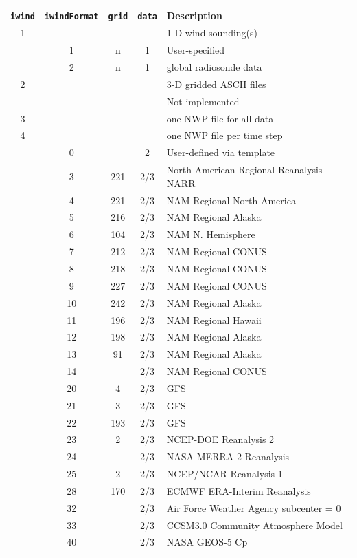 \small
\begin{table}[htbp]
\begin{center}
\begin{tabular}{| c | c| c | c | l |}
\hline
\texttt{iwind} & \texttt{iwindFormat} & \texttt{grid} & \texttt{data} &Description \\
\hline
1& & & & 1-D wind sounding(s) \\
\hline
 &1&n&1& User-specified \\
 &2&n&1& global radiosonde data \\
\hline
2& & & &3-D gridded ASCII files \\
 & & & &Not implemented\\
\hline
3& & & &one NWP file for all data\\
4& & & &one NWP file per time step\\
\hline
 & 0& &2&User-defined via template\\
 & 3&221&2/3&North American Regional Reanalysis NARR\\
 & 4&221&2/3&NAM Regional North America\\
 & 5&216&2/3&NAM Regional Alaska\\
 & 6&104&2/3&NAM N. Hemisphere\\
 & 7&212&2/3&NAM Regional CONUS\\
 & 8&218&2/3&NAM Regional CONUS\\
 & 9&227&2/3&NAM Regional CONUS\\
 &10&242&2/3&NAM Regional Alaska\\
 &11&196&2/3&NAM Regional Hawaii\\
 &12&198&2/3&NAM Regional Alaska\\
 &13& 91&2/3&NAM Regional Alaska\\
 &14&   &2/3&NAM Regional CONUS \\
 &20&  4&2/3&GFS\\
 &21&  3&2/3&GFS\\
 &22&193&2/3&GFS\\
 &23&  2&2/3&NCEP-DOE Reanalysis 2\\
 &24&   &2/3&NASA-MERRA-2 Reanalysis\\
 &25&  2&2/3&NCEP/NCAR Reanalysis 1\\
 &28&170&2/3&ECMWF ERA-Interim Reanalysis\\
 &32&   &2/3&Air Force Weather Agency subcenter = 0\\
 &33&   &2/3&CCSM3.0 Community Atmosphere Model\\
 &40&   &2/3&NASA GEOS-5 Cp\\

\end{tabular}
\end{center}
\end{table}
